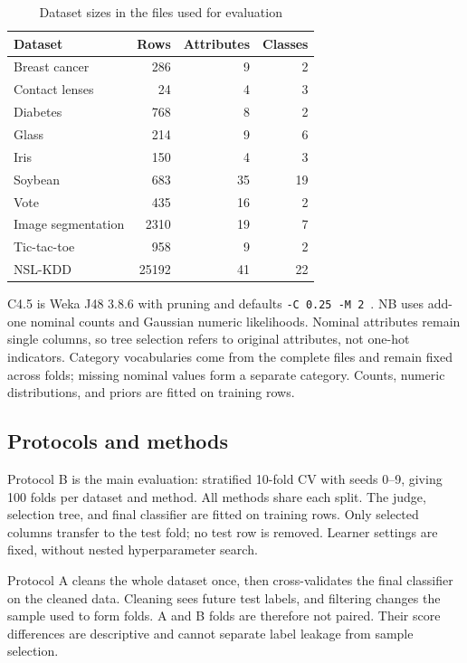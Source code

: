 \documentclass[conference]{IEEEtran}
\begin{document}
\begin{table}[t]
\caption{Dataset sizes in the files used for evaluation}
\label{tab:data}
\centering
\begin{tabular}{lrrr}
\toprule
Dataset & Rows & Attributes & Classes \\
\midrule
Breast cancer & 286 & 9 & 2 \\
Contact lenses & 24 & 4 & 3 \\
Diabetes & 768 & 8 & 2 \\
Glass & 214 & 9 & 6 \\
Iris & 150 & 4 & 3 \\
Soybean & 683 & 35 & 19 \\
Vote & 435 & 16 & 2 \\
Image segmentation & 2310 & 19 & 7 \\
Tic-tac-toe & 958 & 9 & 2 \\
NSL-KDD & 25192 & 41 & 22 \\
\bottomrule
\end{tabular}
\end{table}

C4.5 is Weka J48 3.8.6 with pruning and defaults
\texttt{-C 0.25 -M 2}~\cite{witten2016weka}. NB uses add-one nominal counts
and Gaussian numeric likelihoods. Nominal attributes remain single columns,
so tree selection refers to original attributes, not one-hot indicators.
Category vocabularies come from the complete files and remain fixed across
folds; missing nominal values form a separate category. Counts, numeric
distributions, and priors are fitted on training rows.

\subsection{Protocols and methods}
Protocol B is the main evaluation: stratified 10-fold CV with seeds 0--9,
giving 100 folds per dataset and method. All methods share each split.
The judge, selection tree, and final classifier are fitted on training
rows. Only selected columns transfer to the test fold; no test row is
removed. Learner settings are fixed, without nested hyperparameter search.

Protocol A cleans the whole dataset once, then cross-validates the final
classifier on the cleaned data. Cleaning sees future test labels, and
filtering changes the sample used to form folds. A and B folds are therefore
not paired. Their score differences are descriptive and cannot separate
label leakage from sample selection.
\end{document}
